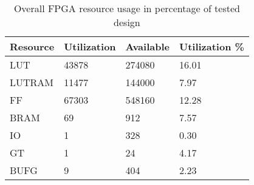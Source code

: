 \begin{table}[]
\centering
\begin{tabular}{|l|l|l|l|}
\hline
Resource & Utilization & Available & Utilization \% \\ \hline
LUT & 43878 & 274080 & 16.01 \\ \hline
LUTRAM & 11477 & 144000 & 7.97 \\ \hline
FF & 67303 & 548160 & 12.28 \\ \hline
BRAM & 69 & 912 & 7.57 \\ \hline
IO & 1 & 328 & 0.30 \\ \hline
GT & 1 & 24 & 4.17 \\ \hline
BUFG & 9 & 404 & 2.23 \\ \hline
\end{tabular}
\caption{Overall FPGA resource usage in percentage of tested design}
\label{tab:overall_util}
\end{table}